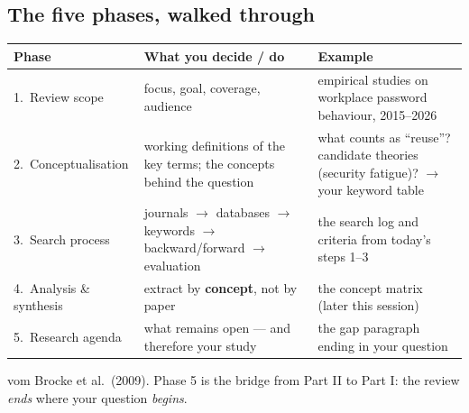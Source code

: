 \documentclass[11pt,a4paper,british,twoside=false,headings=small,chapterprefix=false,numbers=noenddot]{scrbook}
\begin{document}
\subsection{The five phases, walked through}
\begin{center}\small
\footnotesize
  \renewcommand{\arraystretch}{1.12}
  \begin{tabular}{@{}p{3.3cm}p{4.6cm}p{5.2cm}@{}}
    \toprule
    \textbf{Phase} & \textbf{What you decide / do} & \textbf{Example}\\
    \midrule
    1.\ Review scope & focus, goal, coverage, audience & empirical studies on workplace password behaviour, 2015--2026\\
    2.\ Conceptualisation & working definitions of the key terms; the concepts behind the question & what counts as ``reuse''? candidate theories (security fatigue)? $\rightarrow$ your keyword table\\
    3.\ Search process & journals $\rightarrow$ databases $\rightarrow$ keywords $\rightarrow$ backward/forward $\rightarrow$ evaluation & the search log and criteria from today's steps 1--3\\
    4.\ Analysis \& synthesis & extract by \textbf{concept}, not by paper & the concept matrix (later this session)\\
    5.\ Research agenda & what remains open --- and therefore your study & the gap paragraph ending in your question\\
    \bottomrule
  \end{tabular}
  {\color{kgrey}\scriptsize vom Brocke et al.\ (2009). Phase 5 is the bridge
  from Part II to Part I: the review \emph{ends} where your question
  \emph{begins}.}
\end{center}
\end{document}

